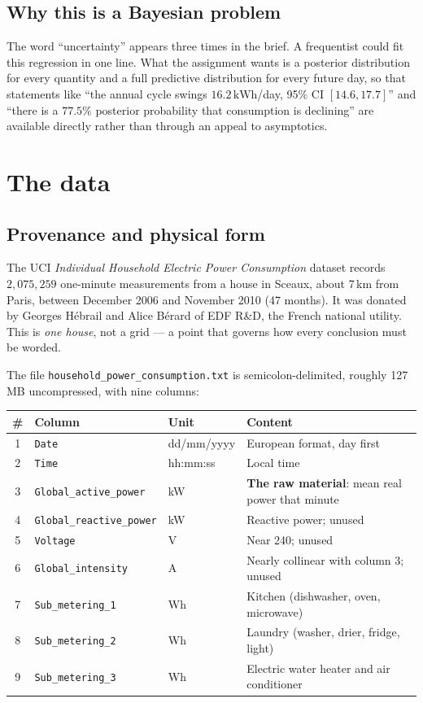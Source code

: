 \documentclass[11pt]{article}
\newcommand{\kwh}{\,\mathrm{kWh}}
\newcommand{\code}[1]{\texttt{\small #1}}
\begin{document}
\subsection{Why this is a Bayesian problem}

The word ``uncertainty'' appears three times in the brief. A frequentist could
fit this regression in one line. What the assignment wants is a posterior
distribution for every quantity and a full predictive distribution for every
future day, so that statements like ``the annual cycle swings
$16.2\kwh$/day, 95\% CI $[14.6, 17.7]$'' and ``there is a $77.5\%$ posterior
probability that consumption is declining'' are available directly rather than
through an appeal to asymptotics.

\section{The data}

\subsection{Provenance and physical form}

The UCI \emph{Individual Household Electric Power Consumption} dataset records
$2{,}075{,}259$ one-minute measurements from a house in Sceaux, about 7\,km
from Paris, between December 2006 and November 2010 (47 months). It was
donated by Georges H\'ebrail and Alice B\'erard of EDF R\&D, the French
national utility. This is \emph{one house}, not a grid --- a point that governs
how every conclusion must be worded.

\begin{sloppypar}
The file \code{household\_\allowbreak power\_\allowbreak consumption.txt} is
semicolon-delimited, roughly 127\,MB uncompressed, with nine columns:
\end{sloppypar}

\begin{center}
\small
\begin{tabular}{@{}clll@{}}
\toprule
\# & Column & Unit & Content \\
\midrule
1 & \code{Date} & dd/mm/yyyy & European format, day first \\
2 & \code{Time} & hh:mm:ss & Local time \\
3 & \code{Global\_active\_power} & kW & \textbf{The raw material}: mean real power that minute \\
4 & \code{Global\_reactive\_power} & kW & Reactive power; unused \\
5 & \code{Voltage} & V & Near 240; unused \\
6 & \code{Global\_intensity} & A & Nearly collinear with column 3; unused \\
7 & \code{Sub\_metering\_1} & Wh & Kitchen (dishwasher, oven, microwave) \\
8 & \code{Sub\_metering\_2} & Wh & Laundry (washer, drier, fridge, light) \\
9 & \code{Sub\_metering\_3} & Wh & Electric water heater and air conditioner \\
\bottomrule
\end{tabular}
\end{center}
\end{document}
